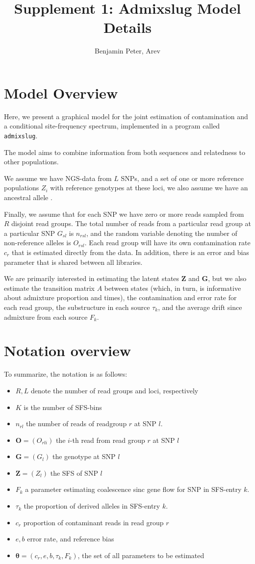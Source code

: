 \documentclass[10pt,a4paper]{article}
\author{Benjamin Peter, Arev}
\title{Supplement 1: Admixslug Model Details}
\newcommand{\BFZ}{\mathbf{Z}}
\newcommand{\BFG}{\mathbf{G}}
\newcommand{\BFO}{\mathbf{O}}
\begin{document}
	\maketitle
\section*{Model Overview}
Here, we present a graphical model for the joint estimation of contamination and a conditional site-frequency spectrum, implemented in a program called \texttt{admixslug}.
	
The model aims to combine information from both sequences and relatedness to other populations.
	
We assume we have NGS-data from $L$ SNPs, and a set of one or more reference populations $Z_i$ with reference genotypes at these loci, we also assume we have an ancestral allele . 
	
Finally, we assume that for each SNP we have zero or more reads sampled from $R$ disjoint read groups. The total number of reads from a particular read group at a particular SNP $G_{sl}$ is $n_{rsl}$, and the random variable denoting the number of non-reference alleles is $O_{rsl}$. Each read group will have its own contamination rate $c_r$ that is estimated directly from the data. In addition, there is an error and bias parameter that is shared between all libraries.


	
	We are primarily interested in estimating the latent states $\BFZ$ and $\BFG$, but we also estimate the transition matrix $A$ between states (which, in turn, is informative about admixture proportion and times), the contamination and error rate for each read group, the substructure in each source $\tau_k$, and the average drift since admixture from each source $F_k$. 
\section*{Notation overview}
	To summarize, the notation is as follows: 
	\begin{itemize}
		\item $R, L$ denote the number of read groups and loci, respectively
		\item $K$ is the number of SFS-bins 
		\item $n_{rl}$ the number of reads of readgroup $r$ at SNP $l$.
		\item $\BFO = (O_{rli})$ the $i$-th read from read group $r$ at SNP $l$
		\item $\BFG = (G_{l})$ the genotype at SNP $l$
		\item $\BFZ = (Z_{l})$ the SFS of SNP $l$
		\item $F_k$ a parameter estimating coalescence sinc gene flow for SNP in SFS-entry $k$.
		\item $\tau_k$ the proportion of derived alleles in SFS-entry $k$.		
		\item $c_r$ proportion of contaminant reads in read group $r$
		\item $e,b$  error rate, and reference bias
		\item $\mathbf{\theta} = (c_r, e, b, \tau_k, F_k)$, the set of all parameters to be estimated
	\end{itemize}
\end{document}
